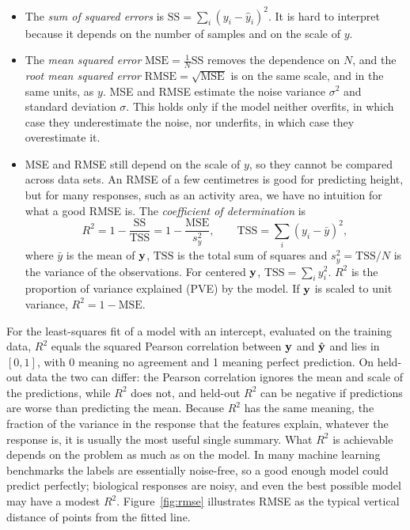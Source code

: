 \begin{itemize}
  \item The \emph{sum of squared errors} is $\text{SS}=\sum_i(y_i-\hat y_i)^2$. It is hard to interpret because it depends on the number of samples and on the scale of $y$.
  \item The \emph{mean squared error} $\text{MSE}=\frac{1}{N}\text{SS}$ removes the dependence on $N$, and the \emph{root mean squared error} $\text{RMSE}=\sqrt{\text{MSE}}$ is on the same scale, and in the same units, as $y$. MSE and RMSE estimate the noise variance $\sigma^2$ and standard deviation $\sigma$. This holds only if the model neither overfits, in which case they underestimate the noise, nor underfits, in which case they overestimate it.
  \item MSE and RMSE still depend on the scale of $y$, so they cannot be compared across data sets. An RMSE of a few centimetres is good for predicting height, but for many responses, such as an activity area, we have no intuition for what a good RMSE is. The \emph{coefficient of determination} is
  \begin{equation}
    R^2 = 1-\frac{\text{SS}}{\text{TSS}} = 1-\frac{\text{MSE}}{s_y^2}, \qquad \text{TSS}=\sum_i(y_i-\bar y)^2,
  \end{equation}
  where $\bar y$ is the mean of $\mathbf{y}$, $\text{TSS}$ is the total sum of squares and $s_y^2=\text{TSS}/N$ is the variance of the observations. For centered $\mathbf{y}$, $\text{TSS}=\sum_i y_i^2$. $R^2$ is the proportion of variance explained (PVE) by the model. If $\mathbf{y}$ is scaled to unit variance, $R^2=1-\text{MSE}$.
\end{itemize}

For the least-squares fit of a model with an intercept, evaluated on the training data, $R^2$ equals the squared Pearson correlation between $\mathbf{y}$ and $\hat{\mathbf{y}}$ and lies in $[0,1]$, with 0 meaning no agreement and 1 meaning perfect prediction. On held-out data the two can differ: the Pearson correlation ignores the mean and scale of the predictions, while $R^2$ does not, and held-out $R^2$ can be negative if predictions are worse than predicting the mean. Because $R^2$ has the same meaning, the fraction of the variance in the response that the features explain, whatever the response is, it is usually the most useful single summary. What $R^2$ is achievable depends on the problem as much as on the model. In many machine learning benchmarks the labels are essentially noise-free, so a good enough model could predict perfectly; biological responses are noisy, and even the best possible model may have a modest $R^2$. Figure~\ref{fig:rmse} illustrates RMSE as the typical vertical distance of points from the fitted line.

